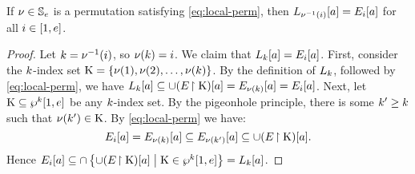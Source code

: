 \begin{lemma}\label{lem:local-lvl-perm}
If $\nu \in \mathbb{S}_{e}$ is a permutation satisfying \cref{eq:local-perm},
then $L_{\nu^{-1}(i)}[a] = E_{i}[a]$ for all $i \in [1,e]$.
\end{lemma}
\begin{proof}
Let $k = \nu^{-1}(i)$, so $\nu(k) = i$.
We claim that $L_{k}[a] = E_{i}[a]$.
First, consider the $k$-index set 
$\mathrm{K} = \left\{\nu(1), \nu(2), \dots, \nu(k)\right\}$.
By the definition of $L_{k}$, followed by \cref{eq:local-perm},
we have $L_{k}[a] \subseteq \cup (E\!\restriction\mathrm{K})[a] = 
E_{\nu(k)}[a] = E_{i}[a]$.
Next, let $\mathrm{K} \subseteq \wp^{k}{[}1,e]$ be any $k$-index set. By the
pigeonhole principle, there is some ${k'} \geq k$ such that $\nu({k'}) \in
\mathrm{K}$.
By \cref{eq:local-perm} we have:
\[
  E_{i}[a] = E_{\nu(k)}[a] \subseteq 
  E_{\nu({k'})}[a] \subseteq \cup (E\!\restriction\mathrm{K})[a].
\]
Hence
$E_{i}[a] \subseteq \cap
\left\{\cup (E\!\restriction\mathrm{K})[a]\mathrel{}\middle|\mathrel{}\mathrm{K} \in \wp^{k}{[}1, e]\right\} =
L_{k}[a]$.
\end{proof}